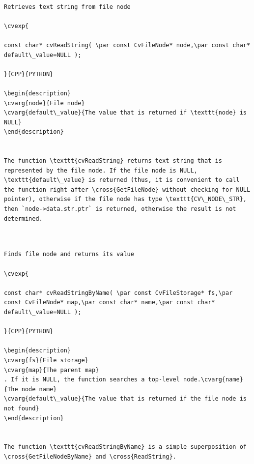 \label{ReadString}
\begin{verbatim}

Retrieves text string from file node

\cvexp{

const char* cvReadString( \par const CvFileNode* node,\par const char* default\_value=NULL );

}{CPP}{PYTHON}

\begin{description}
\cvarg{node}{File node}
\cvarg{default\_value}{The value that is returned if \texttt{node} is NULL}
\end{description}


The function \texttt{cvReadString} returns text string that is represented by the file node. If the file node is NULL, \texttt{default\_value} is returned (thus, it is convenient to call the function right after \cross{GetFileNode} without checking for NULL pointer), otherwise if the file node has type \texttt{CV\_NODE\_STR}, then `node->data.str.ptr` is returned, otherwise the result is not determined.


\end{verbatim}
\label{ReadStringByName}
\begin{verbatim}

Finds file node and returns its value

\cvexp{

const char* cvReadStringByName( \par const CvFileStorage* fs,\par const CvFileNode* map,\par const char* name,\par const char* default\_value=NULL );

}{CPP}{PYTHON}

\begin{description}
\cvarg{fs}{File storage}
\cvarg{map}{The parent map}
. If it is NULL, the function searches a top-level node.\cvarg{name}{The node name}
\cvarg{default\_value}{The value that is returned if the file node is not found}
\end{description}


The function \texttt{cvReadStringByName} is a simple superposition of \cross{GetFileNodeByName} and \cross{ReadString}.


\end{verbatim}
\label{Read}
